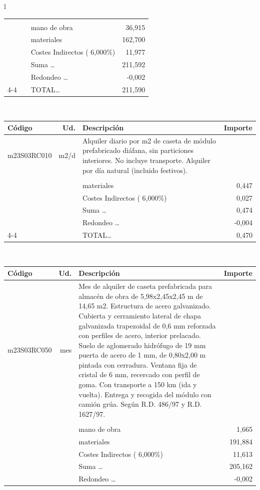 \documentclass{book}%
\begin{document}
\begin{longtable}{l}
\begin{tabular}{l r p{60mm} r}
&&&\\%
&&mano de obra&    36,915\\%
&&materiales&   162,700\\%
&&Costes Indirectos (     6,000\%)&    11,977\\%
&&Suma \ldots&   211,592\\%
&&Redondeo \ldots&    {-}0,002\\%
\cline{4-4}%
&&TOTAL\ldots&   211,590\\%
\end{tabular}\\%
\begin{tabular}{l r p{60mm} r}%
Código&Ud.&Descripción&Importe\\%
\hline%
m23S03RC010&m2/d&Alquiler diario por m2 de caseta de módulo prefabricado diáfana, sin particiones interiores. No incluye transporte. Alquiler por día natural (incluido festivos).&\\%
&&&\\%
&&materiales&     0,447\\%
&&Costes Indirectos (     6,000\%)&     0,027\\%
&&Suma \ldots&     0,474\\%
&&Redondeo \ldots&    {-}0,004\\%
\cline{4-4}%
&&TOTAL\ldots&     0,470\\%
\end{tabular}\\%
\begin{tabular}{l r p{60mm} r}%
Código&Ud.&Descripción&Importe\\%
\hline%
m23S03RC050&mes&Mes de alquiler de caseta prefabricada para almacén de obra de 5,98x2,45x2,45 m de 14,65 m2. Estructura de acero galvanizado. Cubierta y cerramiento lateral de chapa galvanizada trapezoidal de 0,6 mm reforzada con perfiles de acero, interior prelacado. Suelo de aglomerado hidrófugo de 19 mm puerta de acero de 1 mm, de 0,80x2,00 m pintada con cerradura. Ventana fija de cristal de 6 mm, recercado con perfil de goma. Con transporte a 150 km (ida y vuelta). Entrega y recogida del módulo con camión grúa. Según R.D. 486/97 y R.D. 1627/97.&\\%
&&&\\%
&&mano de obra&     1,665\\%
&&materiales&   191,884\\%
&&Costes Indirectos (     6,000\%)&    11,613\\%
&&Suma \ldots&   205,162\\%
&&Redondeo \ldots&    {-}0,002\\%

\end{tabular}
\end{longtable}
\end{document}
